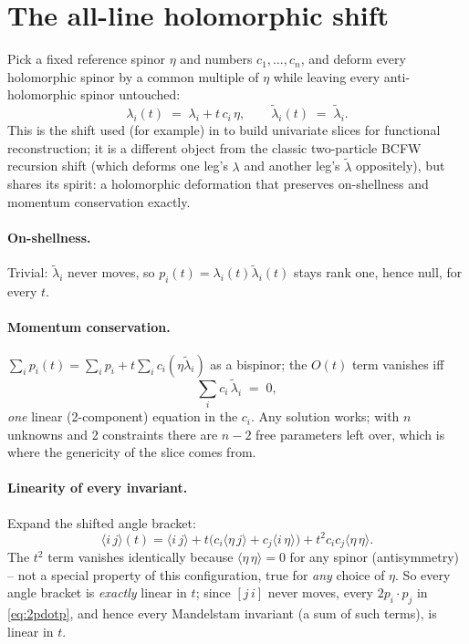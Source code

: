 \documentclass[11pt]{article}
\newcommand{\ang}[2]{\langle #1\,#2\rangle}
\newcommand{\sq}[2]{[#1\,#2]}
\newcommand{\lam}{\lambda}
\newcommand{\lt}{\tilde\lambda}
\theoremstyle{definition}
\begin{document}
\section{The all-line holomorphic shift}
\label{sec:shift}

Pick a fixed reference spinor $\eta$ and numbers $c_1,\dots,c_n$, and deform every
holomorphic spinor by a common multiple of $\eta$ while leaving every anti-holomorphic spinor
untouched:
\begin{equation}
\lam_i(t) \;=\; \lam_i + t\, c_i\, \eta, \qquad \lt_i(t) \;=\; \lt_i . \label{eq:shift}
\end{equation}
This is the shift used (for example) in \cite{Abreu2412,Abreu2110} to build univariate slices for
functional reconstruction; it is a different object from the classic two-particle BCFW
recursion shift (which deforms one leg's $\lam$ and another leg's $\lt$ oppositely), but shares
its spirit: a holomorphic deformation that preserves on-shellness and momentum conservation
exactly.

\paragraph{On-shellness.} Trivial: $\lt_i$ never moves, so $p_i(t)=\lam_i(t)\lt_i(t)$ stays rank
one, hence null, for every $t$.

\paragraph{Momentum conservation.} $\sum_i p_i(t) = \sum_i p_i + t\sum_i c_i(\eta\lt_i) $ as a
bispinor; the $O(t)$ term vanishes iff
\begin{equation}
\sum_i c_i\, \lt_i \;=\; 0, \label{eq:momcons}
\end{equation}
\emph{one} linear (2-component) equation in the $c_i$. Any solution works; with $n$ unknowns
and 2 constraints there are $n-2$ free parameters left over, which is where the genericity of the
slice comes from.

\paragraph{Linearity of every invariant.} Expand the shifted angle bracket:
\begin{equation}
\ang{i}{j}(t) = \ang{i}{j} + t\big(c_i\ang{\eta}{j} + c_j\ang{i}{\eta}\big) + t^2 c_ic_j\ang{\eta}{\eta}.
\end{equation}
The $t^2$ term vanishes identically because $\ang{\eta}{\eta}=0$ for any spinor (antisymmetry) --
not a special property of this configuration, true for \emph{any} choice of $\eta$. So every
angle bracket is \emph{exactly} linear in $t$; since $\sq{j}{i}$ never moves, every
$2p_i\cdot p_j$ in \eqref{eq:2pdotp}, and hence every Mandelstam invariant (a sum of such terms),
is linear in $t$.
\end{document}
